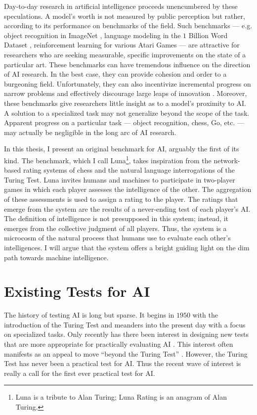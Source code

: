 Day-to-day research in artificial intelligence proceeds unencumbered by these speculations. A model's worth is not measured by public perception but rather, according to its performance on benchmarks of the field. Such benchmarks --- e.g. object recognition in ImageNet  \citep{russakovsky2015imagenet}, language modeling in the $1$ Billion Word Dataset  \citep{chelba2013one}, reinforcement learning for various Atari Games \citep{mnih2013playing} --- are attractive for researchers who are seeking measurable, specific improvements on the state of a particular art. These benchmarks can have tremendous influence on the direction of AI research. In the best case, they can provide cohesion and order to a burgeoning field. Unfortunately, they can also incentivize incremental progress on narrow problems and effectively discourage large leaps of innovation \citep{shieber2015}. Moreover, these benchmarks give researchers little insight as to a model's proximity to AI. A solution to a specialized task may not generalize beyond the scope of the task. Apparent progress on a particular task --- object recognition, chess, Go, etc. --- may actually be negligible in the long arc of AI research.

In this thesis, I present an original benchmark for AI, arguably the first of its kind. The benchmark, which I call Luna\footnote{Luna is a tribute to Alan Turing; Luna Rating is an anagram of Alan Turing.}, takes inspiration from the network-based rating systems of chess and the natural language interrogations of the Turing Test. Luna invites humans and machines to participate in two-player games in which each player assesses the intelligence of the other. The aggregation of these assessments is used to assign a rating to the player. The ratings that emerge from the system are the results of a never-ending test of each player's AI. The definition of intelligence is not presupposed in this system; instead, it emerges from the collective judgment of all players. Thus, the system is a microcosm of the natural process that humans use to evaluate each other's intelligences. I will argue that the system offers a bright guiding light on the dim path towards machine intelligence.

\section{Existing Tests for AI}

The history of testing AI is long but sparse. It begins in $1950$ with the introduction of the Turing Test and meanders into the present day with a focus on specialized tasks. Only recently has there been interest in designing new tests that are more appropriate for practically evaluating AI  \citep{you2015beyond}. This interest often manifests as an appeal to move ``beyond the Turing Test''  \citep{1_the_newyorker_2015}. However, the Turing Test has never been a practical test for AI. Thus the recent wave of interest is really a call for the first ever practical test for AI.

